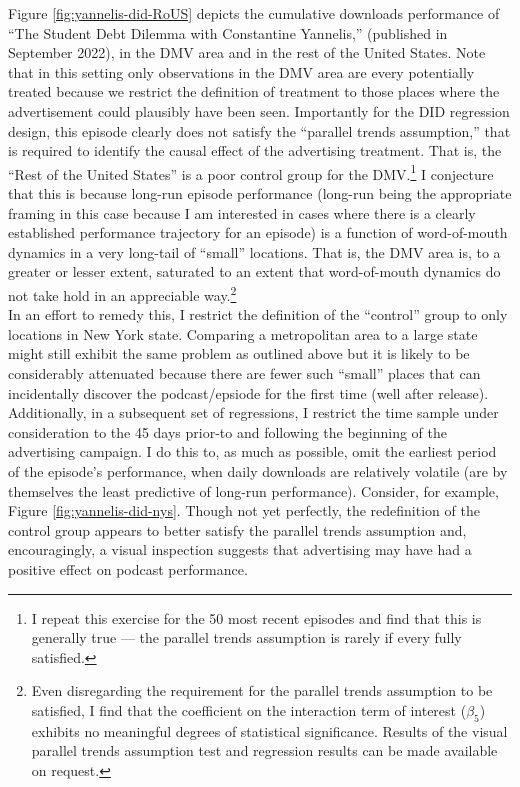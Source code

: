 \documentclass[11pt, letterpaper, twoside]{article}
\begin{document}
Figure \ref{fig:yannelis-did-RoUS} depicts the cumulative downloads performance of ``The Student Debt Dilemma with Constantine Yannelis,'' (published in September 2022), in the DMV area and in the rest of the United States. Note that in this setting only observations in the DMV area are every potentially treated because we restrict the definition of treatment to those places where the advertisement could plausibly have been seen. Importantly for the DID regression design, this episode clearly does not satisfy the ``parallel trends assumption,'' that is required to identify the causal effect of the advertising treatment. That is, the ``Rest of the United States'' is a poor control group for the DMV.\footnote{I repeat this exercise for the 50 most recent episodes and find that this is generally true --- the parallel trends assumption is rarely if every fully satisfied.} I conjecture that this is because long-run episode performance (long-run being the appropriate framing in this case because I am interested in cases where there is a clearly established performance trajectory for an episode) is a function of word-of-mouth dynamics in a very long-tail of ``small'' locations. That is, the DMV area is, to a greater or lesser extent, saturated to an extent that word-of-mouth dynamics do not take hold in an appreciable way.\footnote{Even disregarding the requirement for the parallel trends assumption to be satisfied, I find that the coefficient on the interaction term of interest ($\beta_5$) exhibits no meaningful degrees of statistical significance. Results of the visual parallel trends assumption test and regression results can be made available on request.}\\

In an effort to remedy this, I restrict the definition of the ``control'' group to only locations in New York state. Comparing a metropolitan area to a large state might still exhibit the same problem as outlined above but it is likely to be considerably attenuated because there are fewer such ``small'' places that can incidentally discover the podcast/epsiode for the first time (well after release). Additionally, in a subsequent set of regressions, I restrict the time sample under consideration to the 45 days prior-to and following the beginning of the advertising campaign. I do this to, as much as possible, omit the earliest period of the episode's performance, when daily downloads are relatively volatile (are by themselves the least predictive of long-run performance). Consider, for example, Figure \ref{fig:yannelis-did-nys}. Though not yet perfectly, the redefinition of the control group appears to better satisfy the parallel trends assumption and, encouragingly, a visual inspection suggests that advertising may have had a positive effect on podcast performance.\\
\end{document}
